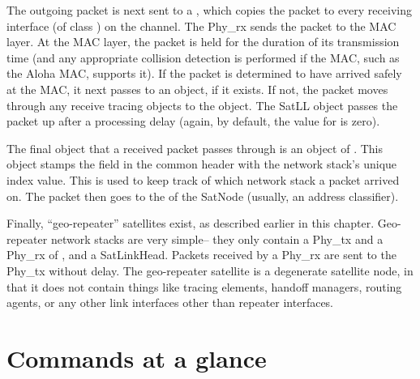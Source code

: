 The outgoing packet is next sent to a , which copies the
packet to every receiving interface (of class ) on the channel. 
The Phy\_rx sends the packet to the MAC layer.  At the MAC layer, the packet
is held for the duration of its transmission time (and any appropriate
collision detection is performed if the MAC, such as the Aloha MAC,
supports it).  If the packet is determined to have arrived safely at the MAC,
it next passes to an  object, if it exists.  If not, the
packet moves through any receive tracing objects to the 
object.  The SatLL object passes the packet up after a processing delay
(again, by default, the value for  is zero).

The final object that a received packet passes through is an object of
.  This object stamps the  field
in the common header with the network stack's unique index value.  This
is used to keep track of which network stack a packet arrived on.  The
packet then goes to the  of the SatNode (usually, an address
classifier).  

Finally, ``geo-repeater'' satellites exist, as described earlier in this
chapter.  Geo-repeater network stacks are very simple-- they only contain
a Phy\_tx and a Phy\_rx of , and a SatLinkHead.  
Packets received by a Phy\_rx are sent to the Phy\_tx without delay.  The
geo-repeater satellite is a degenerate satellite node, in that it does not
contain things like tracing elements, handoff managers, routing agents, or 
any other link interfaces other than repeater interfaces.


\section{Commands at a glance}
\label{sec:satcommands}

